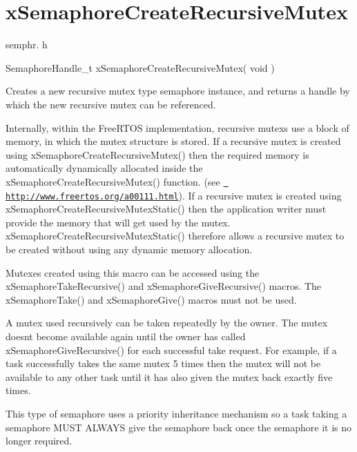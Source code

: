 \hypertarget{group__x_semaphore_create_recursive_mutex}{}\section{x\+Semaphore\+Create\+Recursive\+Mutex}
\label{group__x_semaphore_create_recursive_mutex}
semphr. h 
\begin{DoxyPre}SemaphoreHandle\_t xSemaphoreCreateRecursiveMutex( void )\end{DoxyPre}


Creates a new recursive mutex type semaphore instance, and returns a handle by which the new recursive mutex can be referenced.

Internally, within the Free\+R\+T\+OS implementation, recursive mutexs use a block of memory, in which the mutex structure is stored. If a recursive mutex is created using x\+Semaphore\+Create\+Recursive\+Mutex() then the required memory is automatically dynamically allocated inside the x\+Semaphore\+Create\+Recursive\+Mutex() function. (see \href{http://www.freertos.org/a00111.html}{\texttt{ http\+://www.\+freertos.\+org/a00111.\+html}}). If a recursive mutex is created using x\+Semaphore\+Create\+Recursive\+Mutex\+Static() then the application writer must provide the memory that will get used by the mutex. x\+Semaphore\+Create\+Recursive\+Mutex\+Static() therefore allows a recursive mutex to be created without using any dynamic memory allocation.

Mutexes created using this macro can be accessed using the x\+Semaphore\+Take\+Recursive() and x\+Semaphore\+Give\+Recursive() macros. The x\+Semaphore\+Take() and x\+Semaphore\+Give() macros must not be used.

A mutex used recursively can be \textquotesingle{}taken\textquotesingle{} repeatedly by the owner. The mutex doesn\textquotesingle{}t become available again until the owner has called x\+Semaphore\+Give\+Recursive() for each successful \textquotesingle{}take\textquotesingle{} request. For example, if a task successfully \textquotesingle{}takes\textquotesingle{} the same mutex 5 times then the mutex will not be available to any other task until it has also \textquotesingle{}given\textquotesingle{} the mutex back exactly five times.

This type of semaphore uses a priority inheritance mechanism so a task \textquotesingle{}taking\textquotesingle{} a semaphore M\+U\+ST A\+L\+W\+A\+YS \textquotesingle{}give\textquotesingle{} the semaphore back once the semaphore it is no longer required.

